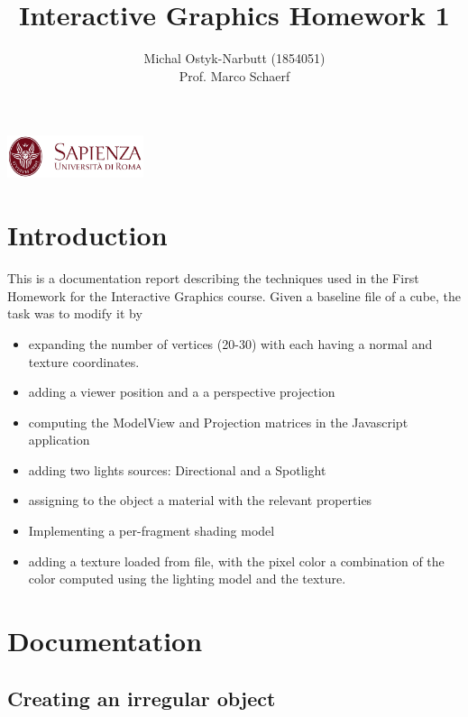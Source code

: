 \documentclass[12pt,a4paper]{article}
\begin{document}
\title{Interactive Graphics Homework 1}
\author{Michal Ostyk-Narbutt (1854051)\\ Prof. Marco Schaerf }

\maketitle


\begin{center}
\includegraphics[width=0.3\textwidth]{img/sapienza_logo.jpg}
\end{center}
\maketitle

\section{Introduction}
This is a documentation report describing the techniques used in the First Homework for the Interactive Graphics course. Given a baseline file of a cube, the task was to modify it by
\begin{itemize}
\item  expanding the number of vertices (20-30) with each having a normal and texture coordinates.
\item adding a viewer position and a a perspective projection
\item computing the ModelView and Projection matrices in the Javascript application
\item adding two lights sources: Directional and a Spotlight
\item assigning to the object a material with the relevant properties
\item  Implementing a per-fragment shading model
\item adding a texture loaded from file, with the pixel color a combination of the color
computed using the lighting model and the texture.
\end{itemize}

\section{Documentation}
\subsection{Creating an irregular object}
\end{document}
